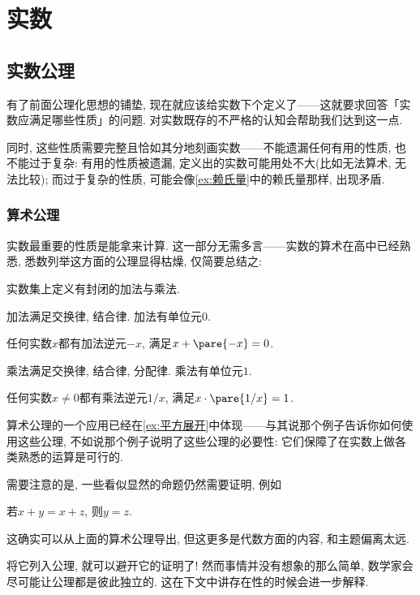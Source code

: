 \documentclass[hidelinks]{ctexart}
\begin{document}



\section{实数} %
\label{sec:实数}

\subsection{实数公理} %
\label{sub:实数公理}

有了前面公理化思想的铺垫, 现在就应该给实数下个定义了——这就要求回答「实数应满足哪些性质」的问题. 对实数既存的不严格的认知会帮助我们达到这一点.
\par
同时, 这些性质需要完整且恰如其分地刻画实数——不能遗漏任何有用的性质, 也不能过于复杂: 有用的性质被遗漏, 定义出的实数可能用处不大(比如无法算术, 无法比较); 而过于复杂的性质, 可能会像\cref{ex:赖氏量}中的赖氏量那样, 出现矛盾.

\subsubsection{算术公理} %
\label{ssub:算术公理}

实数最重要的性质是能拿来计算. 这一部分无需多言——实数的算术在高中已经熟悉, 悉数列举这方面的公理显得枯燥, 仅简要总结之:
\begin{finale}
    \begin{axiom}[算术公理]
        \label{ax:算术公理}
        \quad
        \begin{cenum}
            \item 实数集上定义有封闭的加法与乘法.
            \item 加法满足交换律, 结合律. 加法有单位元$0$.
            \item 任何实数$x$都有加法逆元$-x$, 满足$x+\pare{-x} = 0$.
            \item 乘法满足交换律, 结合律, 分配律. 乘法有单位元$1$.
            \item 任何实数$x\neq 0$都有乘法逆元$1/x$, 满足$x\cdot\pare{1/x} = 1$.
        \end{cenum}
    \end{axiom}
\end{finale}
算术公理的一个应用已经在\cref{ex:平方展开}中体现——与其说那个例子告诉你如何使用这些公理, 不如说那个例子说明了这些公理的必要性: 它们保障了在实数上做各类熟悉的运算是可行的.
\par
需要注意的是, 一些看似显然的命题仍然需要证明, 例如
\begin{ex}
    \label{ex:天平原理}
    若$x+y=x+z$, 则$y=z$.
\end{ex}
这确实可以从上面的算术公理导出, 但这更多是代数方面的内容, 和主题偏离太远.
\begin{remark}
    将它列入公理, 就可以避开它的证明了! 然而事情并没有想象的那么简单, 数学家会尽可能让公理都是彼此独立的. 这在下文中讲存在性的时候会进一步解释.
\end{remark}
\end{document}
